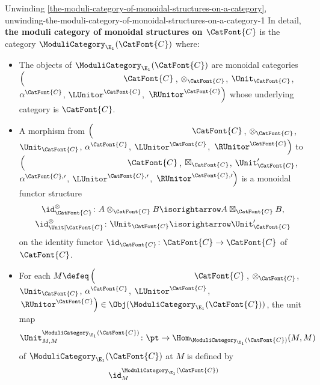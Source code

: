 \begin{remark}{Unwinding \cref{the-moduli-category-of-monoidal-structures-on-a-category}, \rmI}{unwinding-the-moduli-category-of-monoidal-structures-on-a-category-1}%
    In detail, \textbf{the moduli category of monoidal structures on $\CatFont{C}$} is the category $\ModuliCategory_{\E_{1}}(\CatFont{C})$ where:
    \begin{itemize}
        \item{}The objects of $\ModuliCategory_{\E_{1}}(\CatFont{C})$ are monoidal categories $\left(\phantom{\mrp{\LUnitor^{\CatFont{C}}}}\CatFont{C}\right.$, $\otimes_{\CatFont{C}}$, $\Unit_{\CatFont{C}}$, $\alpha^{\CatFont{C}}$, $\LUnitor^{\CatFont{C}}$, $\left.\RUnitor^{\CatFont{C}}\right)$ whose underlying category is $\CatFont{C}$.
        \item{}A morphism from $\left(\phantom{\mrp{\LUnitor^{\CatFont{C}}}}\CatFont{C}\right.$, $\otimes_{\CatFont{C}}$, $\Unit_{\CatFont{C}}$, $\alpha^{\CatFont{C}}$, $\LUnitor^{\CatFont{C}}$, $\left.\RUnitor^{\CatFont{C}}\right)$ to $\left(\phantom{\mrp{\LUnitor^{\CatFont{C},\prime}}}\CatFont{C}\right.$, $\boxtimes_{\CatFont{C}}$, $\Unit'_{\CatFont{C}}$, $\alpha^{\CatFont{C},\prime}$, $\LUnitor^{\CatFont{C},\prime}$, $\left.\RUnitor^{\CatFont{C},\prime}\right)$ is a monoidal functor structure
            \begin{gather*}
                \id^{\otimes}_{\CatFont{C}}       \colon A\otimes_{\CatFont{C}}B \isorightarrow A\boxtimes_{\CatFont{C}}B,\\
                \id^{\otimes}_{\Unit|\CatFont{C}} \colon \Unit_{\CatFont{C}}     \isorightarrow \Unit'_{\CatFont{C}}
            \end{gather*}
            on the identity functor $\id_{\CatFont{C}}\colon\CatFont{C}\to\CatFont{C}$ of $\CatFont{C}$.
        \item{}For each $M\defeq\left(\phantom{\mrp{\LUnitor^{\CatFont{C}}}}\CatFont{C}\right.$, $\otimes_{\CatFont{C}}$, $\Unit_{\CatFont{C}}$, $\alpha^{\CatFont{C}}$, $\LUnitor^{\CatFont{C}}$, $\left.\RUnitor^{\CatFont{C}}\right)\in\Obj(\ModuliCategory_{\E_{1}}(\CatFont{C}))$, the unit map
            \[
                \Unit^{\ModuliCategory_{\E_{1}}(\CatFont{C})}_{M,M}
                \colon%
                \pt%
                \to
                \Hom_{\ModuliCategory_{\E_{1}}(\CatFont{C})}(M,M)
            \]%
            of $\ModuliCategory_{\E_{1}}(\CatFont{C})$ at $M$ is defined by
            \[
                \id^{\ModuliCategory_{\E_{1}}(\CatFont{C})}_{M}%
\]
\end{itemize}
\end{remark}
